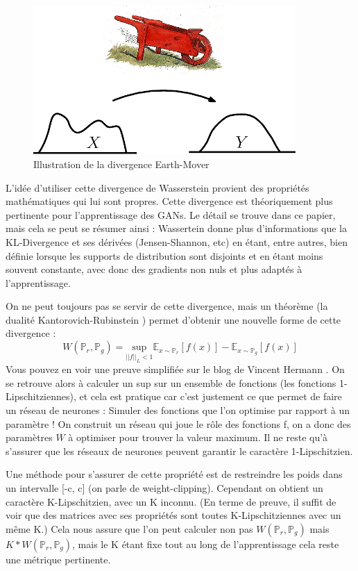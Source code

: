 \begin{figure}[ht!]
  \centering
    \includegraphics[width=10cm]{fig/Earth_mover_distance}
    \caption{Illustration de la divergence Earth-Mover}
    \label{fig:E-M_distance}
\end{figure}


L'idée d'utiliser cette divergence de Wasserstein provient des propriétés mathématiques qui lui sont propres. Cette divergence est théoriquement plus pertinente pour l'apprentissage des GANs. Le détail se trouve dans ce papier, mais cela se peut se résumer ainsi : Wassertein donne plus d'informations que la KL-Divergence et ses dérivées (Jensen-Shannon, etc) en étant, entre autres, bien définie lorsque les supports de distribution sont disjoints et en étant moins souvent constante, avec donc des gradients non nuls et plus adaptés à l'apprentissage.

On ne peut toujours pas se servir de cette divergence, mais un théorème (la dualité Kantorovich-Rubinstein \cite{optimal-transport}) permet d'obtenir une nouvelle forme de cette divergence :
\[
W(\mathbb{P}_r, \mathbb{P}_g) = \underset{||f||_L<1}{\text{sup}}\mathbb{E}_{x\sim\mathbb{P}_r}\left[f(x)\right] - \mathbb{E}_{x\sim\mathbb{P}_g}\left[f(x)\right]
\]
Vous pouvez en voir une preuve simplifiée sur le blog de Vincent Hermann \cite{preuve-wgan}.
On se retrouve alors à calculer un sup sur un ensemble de fonctions (les fonctions 1-Lipschitziennes), et cela est pratique car c'est justement ce que permet de faire un réseau de neurones : Simuler des fonctions que l'on optimise par rapport à un paramètre ! On construit un réseau qui joue le rôle des fonctions f, on a donc des paramètres $W$ à optimiser pour trouver la valeur maximum. Il ne reste qu'à s'assurer que les réseaux de neurones peuvent garantir le caractère 1-Lipschitzien.

Une méthode pour s'assurer de cette propriété est de restreindre les poids dans un intervalle [-c, c] (on parle de weight-clipping). Cependant on obtient un caractère K-Lipschitzien, avec un K inconnu. (En terme de preuve, il suffit de voir que des matrices avec ses propriétés sont toutes K-Lipschitziennes avec un même K.) Cela nous assure que l'on peut calculer non pas $W(\mathbb{P}_r, \mathbb{P}_g)$ mais $K*W(\mathbb{P}_r, \mathbb{P}_g)$, mais le K étant fixe tout au long de l'apprentissage cela reste une métrique pertinente. 

